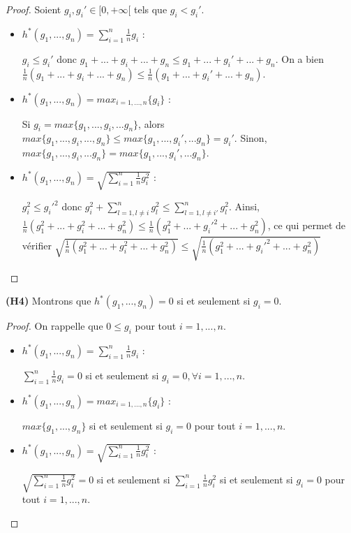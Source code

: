 \documentclass[a4paper]{article}
\begin{document}
\begin{proof}
    Soient $g_i, g_i' \in [0,+\infty[$ tels que $g_i < g_i'$. \\
    \begin{itemize}
    
        \item $h^*(g_1,...,g_n) = \sum_{i=1}^{n} \frac{1}{n} g_i$ :

            $g_i \leq g_i'$ donc $g_1+...+g_i+...+ g_n \leq g_1+...+
            g_i'+...+g_n$. On a bien $\frac{1}{n}(g_1+...+g_i+...+g_n) \leq
            \frac{1}{n}(g_1+...+g_i'+...+g_n)$.

        \item $h^*(g_1,...,g_n) = max_{i=1,...,n} \{g_i\}$ :

            Si $g_i = max \{g_1,...,g_i,...g_n\}$, alors $max
            \{g_1,...,g_i,...,g_n\} \leq max \{g_1,...,g_i',...g_n\} = g_i'$.
            Sinon, $max \{g_1,...,g_i,...g_n\} = max \{g_1,...,g_i',...g_n\}$.

        \item $h^*(g_1,...,g_n) = \sqrt{\sum_{i=1}^{n} \frac{1}{n} g_i^2}$ :

            $g_i^2 \leq g_i'^2$ donc $g_i^2 + \sum_{l=1,l \neq i}^{n} g_l^2 \leq
            \sum_{l=1,l \neq i'}^{n} g_l^2$. Ainsi,
            $\frac{1}{n}(g_1^2+...+g_i^2+...+g_n^2) \leq
            \frac{1}{n}(g_1^2+...+g_i'^2+...+g_n^2)$, ce qui permet de vérifier
            $\sqrt{\frac{1}{n}(g_1^2+...+g_i^2+...+g_n^2)} \leq
            \sqrt{\frac{1}{n}(g_1^2+...+g_i'^2+...+g_n^2)} $

    \end{itemize}
\end{proof}

\textbf{(H4)} Montrons que $h^*(g_1,...,g_n) = 0$ si et seulement si $g_i = 0$.

\begin{proof}
    On rappelle que $0 \leq g_i$ pour tout $i=1,...,n$.
    \begin{itemize}
        \item $h^*(g_1,...,g_n) = \sum_{i=1}^{n} \frac{1}{n} g_i$ :
            
            $\sum_{i=1}^{n} \frac{1}{n} g_i = 0$ si et seulement si $g_i=0,
            \forall i=1,...,n$.

        \item $h^*(g_1,...,g_n) = max_{i=1,...,n} \{g_i\}$ :

            $max \{g_1,...,g_n\}$ si et seulement si $g_i=0$ pour tout
            $i=1,...,n$. 

        \item $h^*(g_1,...,g_n) = \sqrt{\sum_{i=1}^{n} \frac{1}{n} g_i^2}$ :

            $\sqrt{\sum_{i=1}^{n} \frac{1}{n} g_i^2} = 0$ si et seulement si
            $\sum_{i=1}^{n} \frac{1}{n} g_i^2$ si et seulement si $g_i=0$ pour
            tout $i=1,...,n$.

    \end{itemize}
\end{proof}
\end{document}
